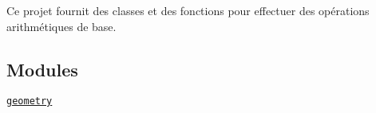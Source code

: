 Ce projet fournit des classes et des fonctions pour effectuer des opérations arithmétiques de base.

\subsection*{Modules}


\begin{DoxyItemize}
\item \href{geometry.py}{\tt geometry} 
\end{DoxyItemize}